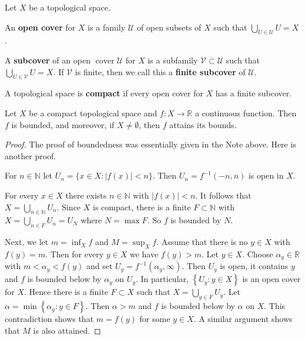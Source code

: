 \documentclass[a4paper,11pt]{article}
\begin{document}
\begin{definition}
    Let $X$ be a topological space.

    An \textbf{open cover} for $X$ is a family $\mathcal{U}$ of open subsets of $X$ such that $\bigcup_{U \in \mathcal{U}} U=X$.

    A \textbf{subcover} of an open $\operatorname{cover} \mathcal{U}$ for $X$ is a subfamily $\mathcal{V} \subset \mathcal{U}$ such that
    $\bigcup_{U \in \mathcal{V}} U=X$. If $\mathcal{V}$ is finite, then we call this a \textbf{finite subcover} of $\mathcal{U}$.

    A topological space is \textbf{compact} if every open cover for $X$ has a finite subcover.
\end{definition}

\begin{theorem}\label{thm:continuous on compact -> bounded}
    Let $X$ be a compact topological space and $f: X \rightarrow \mathbb{R}$ a continuous function.
Then $f$ is bounded, and moreover, if $X \neq \emptyset$, then $f$ attains its bounds.
\end{theorem}
\begin{proof}
    The proof of boundedness was essentially given in the Note above. Here is another proof.

    For $n \in \mathbb{N}$ let $U_{n}=\{x \in X:|f(x)|<n\}$. Then $U_{n}=f^{-1}(-n, n)$ is open in $X$.

    For every $x \in X$ there exists $n \in \mathbb{N}$ with $|f(x)|<n$. It follows that
    $X=\bigcup_{n \in \mathbb{N}} U_{n}$. Since $X$ is compact, there is a finite $F \subset \mathbb{N}$ with
    $X=\bigcup_{n \in F} U_{n}=U_{N}$ where $N=\max F$. So $f$ is bounded by $N$.

    Next, we let $m=\inf _{X} f$ and $M=\sup _{X} f$. Assume that there is no $y \in X$ with $f(y)=m$. Then for every $y \in X$ we have $f(y)>m$. Let $y \in X$. Choose $\alpha_{y} \in \mathbb{R}$ with $m<\alpha_{y}<f(y)$ and set $U_{y}=f^{-1}\left(\alpha_{y}, \infty\right)$. Then $U_{y}$ is open, it contains $y$ and $f$ is bounded below by $\alpha_{y}$ on $U_{y}$. In particular, $\left\{U_{y}: y \in X\right\}$ is an open cover for $X$. Hence there is a finite $F \subset X$ such that $X=\bigcup_{y \in F} U_{y}$. Let $\alpha=\min \left\{\alpha_{y}: y \in F\right\}$. Then $\alpha>m$ and $f$ is bounded below by $\alpha$ on $X$. This contradiction shows that $m=f(y)$ for some $y \in X$. A similar argument shows that $M$ is also attained.
\end{proof}
\end{document}
